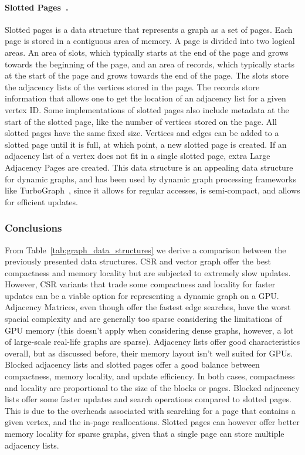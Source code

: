     \paragraph{\textbf{Slotted Pages}~\cite{paper:turbograph}.} Slotted pages is a data structure that represents a graph as a set of pages. Each page is stored in a contiguous area of memory. A page is divided into two logical areas. An area of slots, which typically starts at the end of the page and grows towards the beginning of the page, and an area of records, which typically starts at the start of the page and grows towards the end of the page. The slots store the adjacency lists of the vertices stored in the page. The records store information that allows one to get the location of an adjacency list for a given vertex ID. Some implementations of slotted pages also include metadata at the start of the slotted page, like the number of vertices stored on the page. All slotted pages have the same fixed size. Vertices and edges can be added to a slotted page until it is full, at which point, a new slotted page is created. If an adjacency list of a vertex does not fit in a single slotted page, extra Large Adjacency Pages are created. This data structure is an appealing data structure for dynamic graphs, and has been used by dynamic graph processing frameworks like TurboGraph~\cite{paper:turbograph}, since it allows for regular accesses, is semi-compact, and allows for efficient updates.

    \subsubsection*{\textbf{Conclusions}}

    From Table~\ref{tab:graph_data_structures} we derive a comparison between the previously presented data structures. \gls{CSR} and vector graph offer the best compactness and memory locality but are subjected to extremely slow updates. However, \gls{CSR} variants that trade some compactness and locality for faster updates can be a viable option for representing a dynamic graph on a \gls{GPU}. Adjacency Matrices, even though offer the fastest edge searches, have the worst spacial complexity and are generally too sparse considering the limitations of \gls{GPU} memory (this doesn't apply when considering dense graphs, however, a lot of large-scale real-life graphs are sparse). Adjacency lists offer good characteristics overall, but as discussed before, their memory layout isn't well suited for \gls{GPU}s. Blocked adjacency lists and slotted pages offer a good balance between compactness, memory locality, and update efficiency. In both cases, compactness and locality are proportional to the size of the blocks or pages. Blocked adjacency lists offer some faster updates and search operations compared to slotted pages. This is due to the overheads associated with searching for a page that contains a given vertex, and the in-page reallocations. Slotted pages can however offer better memory locality for sparse graphs, given that a single page can store multiple adjacency lists.

